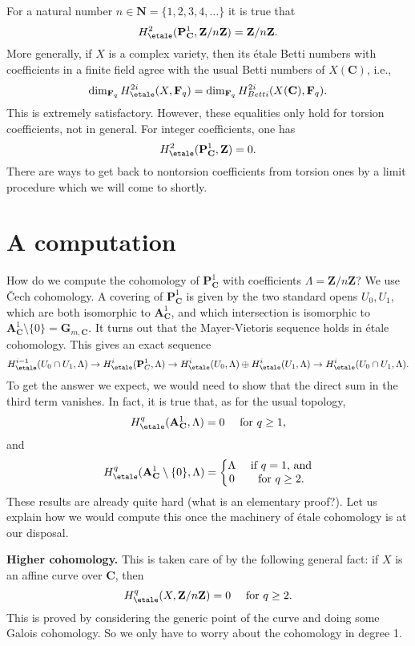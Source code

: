 \noindent
For a natural number $n \in \mathbf{N} = \{1, 2, 3, 4, \ldots\}$ it is true that
$$
H_\etale^2 (\mathbf{P}^1_\mathbf{C}, \mathbf{Z}/n\mathbf{Z}) =
\mathbf{Z}/n\mathbf{Z}.
$$
More generally, if $X$ is a complex variety, then its \'etale Betti numbers
with coefficients in a finite field agree with the usual Betti numbers of
$X(\mathbf{C})$, i.e.,
$$
\dim_{\mathbf{F}_q} H_\etale^{2i} (X, \mathbf{F}_q) =
\dim_{\mathbf{F}_q} H_{Betti}^{2i} (X(\mathbf{C}), \mathbf{F}_q).
$$
This is extremely satisfactory. However, these equalities only hold for torsion
coefficients, not in general. For integer coefficients, one has
$$
H_\etale^2 (\mathbf{P}^1_\mathbf{C}, \mathbf{Z}) = 0.
$$
There are ways to get back to nontorsion coefficients from torsion ones by a
limit procedure which we will come to shortly.




\section{A computation}
\label{section-computation}

\noindent
How do we compute the cohomology of $\mathbf{P}^1_\mathbf{C}$ with coefficients
$\Lambda = \mathbf{Z}/n\mathbf{Z}$?
We use {\v C}ech cohomology. A covering of $\mathbf{P}^1_\mathbf{C}$ is given
by the two standard opens $U_0, U_1$, which are both
isomorphic to $\mathbf{A}^1_\mathbf{C}$, and which intersection is isomorphic
to $\mathbf{A}^1_\mathbf{C} \setminus \{0\} = \mathbf{G}_{m, \mathbf{C}}$.
It turns out that the Mayer-Vietoris sequence holds in \'etale cohomology.
This gives an exact sequence
$$
H_\etale^{i-1}(U_0\cap U_1, \Lambda) \to
H_\etale^i(\mathbf{P}^1_C, \Lambda) \to
H_\etale^i(U_0, \Lambda) \oplus
H_\etale^i(U_1, \Lambda) \to H_\etale^i(U_0\cap U_1,
\Lambda).
$$
To get the answer we expect, we would need to show that the direct sum in the
third term vanishes. In fact, it is true that, as for the usual topology,
$$
H_\etale^q (\mathbf{A}^1_\mathbf{C}, \Lambda) = 0
\quad \text{ for } q \geq 1,
$$
and
$$
H_\etale^q (\mathbf{A}^1_\mathbf{C} \setminus \{0\}, \Lambda) = \left\{
\begin{matrix}
\Lambda & \text{ if }q = 1\text{, and} \\
0 & \text{ for }q \geq 2.
\end{matrix}
\right.
$$
These results are already quite hard (what is an elementary proof?). Let us
explain how we would compute this once the machinery of \'etale cohomology is
at our disposal.

\medskip\noindent
{\bf Higher cohomology.} This is taken care of by the following general
fact: if $X$ is an affine curve over $\mathbf{C}$, then
$$
H_\etale^q (X, \mathbf{Z}/n\mathbf{Z}) = 0 \quad \text{ for } q \geq 2.
$$
This is proved by considering the generic point of the curve and doing some
Galois cohomology. So we only have to worry about the cohomology in degree 1.

